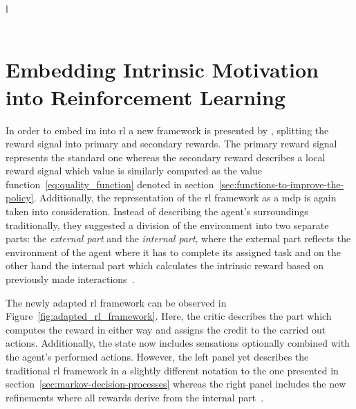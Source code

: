\documentclass[draft,final]{vutinfth} %
\newcommand{\p}[1]{see p. #1}
\begin{document}
\begin{table}[h]
\begin{tabular}{l}
                                                                                                                          \\ \hline
                                                     \\ \hline
        \end{tabular}
        \caption[Classification of Intrinsic Motivations in Reinforcement Learning]{Classification of \glspl{im} in \gls{rl}\protect\footnotemark[2]}
        \label{tab:clasification_im_rl}
    \end{table}
    \footnotetext[2]{\citep[\p{9}]{aubret_survey_2019}}

    \section{Embedding Intrinsic Motivation into Reinforcement Learning}\label{sec:embeddingglsinto-theglsframework}

    In order to embed \gls{im} into \gls{rl} a new framework is presented by \citeauthor{singh_intrinsically_2010}, splitting the reward signal into primary and secondary rewards.
    The primary reward signal represents the standard one whereas the secondary reward describes a local reward signal which value is similarly computed as the value function~\eqref{eq:quality_function} denoted in section~\ref{sec:functions-to-improve-the-policy}.
    Additionally, the representation of the \gls{rl} framework as a \gls{mdp} is again taken into consideration.
    Instead of describing the agent's surroundings traditionally, they suggested a division of the environment into two separate parts: the \textit{external part} and the \textit{internal part}, where the external part reflects the environment of the agent where it has to complete its assigned task and on the other hand the internal part which calculates the intrinsic reward based on previously made interactions~\citep{aubret_survey_2019}.

    The newly adapted \gls{rl} framework can be observed in Figure~\ref{fig:adapted_rl_framework}.
    Here, the critic describes the part which computes the reward in either way and assigns the credit to the carried out actions.
    Additionally, the state now includes sensations optionally combined with the agent's performed actions.
    However, the left panel yet describes the traditional \gls{rl} framework in a slightly different notation to the one presented in section~\ref{sec:markov-decision-processes} whereas the right panel includes the new refinements where all rewards derive from the internal part~\citep{singh_intrinsically_2010}.
\end{document}
